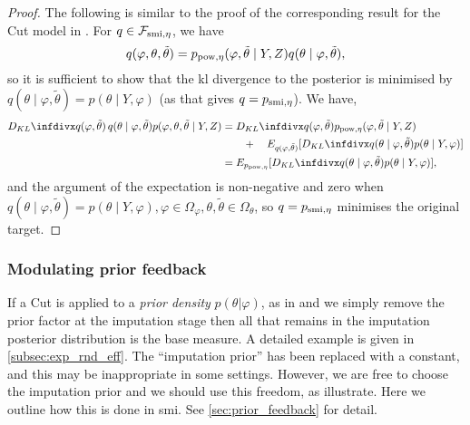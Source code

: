 \begin{proof}
  The following is similar to the proof of the corresponding result for the Cut model in \cite{Yu2021variationalcut}.
  For $q\in \mathcal{F}_{\operatorname{\text{smi}},\eta}$, we have
  \[
    q(\varphi,\theta,\tilde\theta)=p_{\operatorname{\text{pow}}, \eta}(\varphi,\tilde\theta \mid Y,Z)q(\theta \mid \varphi,\tilde\theta),
  \]
  so it is sufficient to show that the \acrshort*{kl} divergence to the posterior is minimised by $q(\theta  \mid \varphi,\tilde\theta)=p(\theta \mid Y,\varphi)$ (as that gives $q=p_{\operatorname{\text{smi}},\eta}$).
  We have,
  \begin{align*}
    \kl{q(\varphi,\tilde\theta)\,q(\theta \mid \varphi,\tilde\theta)}{ p(\varphi,\theta,\tilde\theta \mid Y,Z)} & = \kl{q(\varphi,\tilde\theta)}{ p_{\pow, \eta}(\varphi,\tilde\theta \mid Y,Z)}                                \\
                                                                                                                & \qquad +\quad E_{q(\varphi,\tilde\theta)}[\kl{q(\theta \mid \varphi,\tilde\theta)}{p(\theta \mid Y,\varphi)}] \\
                                                                                                                & =E_{p_{\pow, \eta} }[\kl{q(\theta \mid \varphi,\tilde\theta)}{p(\theta \mid Y,\varphi)}],
  \end{align*}
  and the argument of the expectation is non-negative and zero when $q(\theta \mid \varphi,\tilde\theta)=p(\theta \mid Y,\varphi), \varphi\in\Omega_\varphi, \theta, \tilde\theta\in \Omega_{\theta}$, so $q=p_{\operatorname{\text{smi}},\eta}$ minimises the original target.
\end{proof}

\subsubsection*{Modulating prior feedback}\label{subsec:mod_prioir_feed_paper}

If a Cut is applied to a \textit{prior density} $p(\theta|\varphi)$, as in \cite{Liu2009modularization,Jacob2017together,Styring2017extensification} and we simply remove the prior factor at the imputation stage then all that remains in the imputation posterior distribution is the base measure. A detailed example is given in \cref{subsec:exp_rnd_eff}.
The ``imputation prior'' has been replaced with a constant, and this may be inappropriate in some settings.
However, we are free to choose the imputation prior and we should use this freedom, as \cite{Moss2022} illustrate. Here we outline how this is done in \acrshort*{smi}. See \cref{sec:prior_feedback} for detail.

